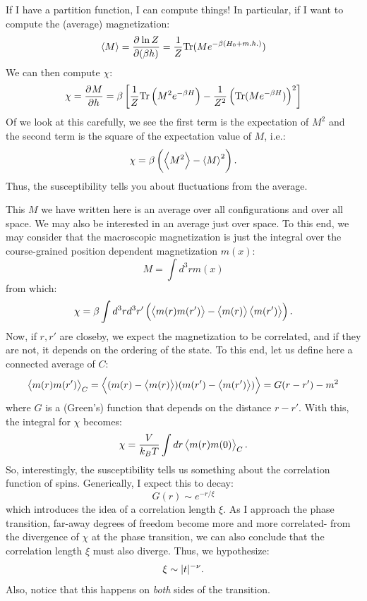 If I have a partition function, I can compute things! In particular, if I want to compute the (average) magnetization:
\begin{equation}
    \avg{M} = \dpd{\ln Z}{(\beta h)} = \frac{1}{Z}\Tr(Me^{-\beta(H_0 + m.h.)})
\end{equation}
We can then compute $\chi$:
\begin{equation}
    \chi = \dpd{M}{h} = \beta\left[\frac{1}{Z}\Tr\left(M^2e^{-\beta H}\right) - \frac{1}{Z^2}\left(\Tr(Me^{-\beta H})\right)^2\right]
\end{equation}
Of we look at this carefully, we see the first term is the expectation of $M^2$ and the second term is the square of the expectation value of $M$, i.e.:
\begin{equation}
    \chi = \beta\left(\left< M^2 \right> - \left< M \right>^2\right).
\end{equation}
Thus, the susceptibility tells you about fluctuations from the average.

This $M$ we have written here is an average over all configurations and over all space. We may also be interested in an average just over space. To this end, we may consider that the macroscopic magnetization is just the integral over the course-grained position dependent magnetization $m(x)$:
\begin{equation}
    M = \int d^3r m(x)
\end{equation}
from which:
\begin{equation}
    \chi = \beta \int d^3r d^3r' \left(\left< m(r)m(r') \right> - \left< m(r) \right>\left< m(r') \right>\right).
\end{equation}
Now, if $r, r'$ are closeby, we expect the magnetization to be correlated, and if they are not, it depends on the ordering of the state. To this end, let us define here a connected average of $C$:
\begin{equation}
    \left< m(r)m(r') \right>_C = \left< (m(r) - \left< m(r) \right>)(m(r') - \left< m(r') \right>) \right> = G(r-r') - m^2
\end{equation}
where $G$ is a (Green's) function that depends on the distance $r-r'$. With this, the integral for $\chi$ becomes:
\begin{equation}
    \chi = \frac{V}{k_B T}\int dr \left< m(r)m(0) \right>_C.
\end{equation}
So, interestingly, the susceptibility tells us something about the correlation function of spins. Generically, I expect this to decay:
\begin{equation}
    G(r) \sim e^{-r/\xi}
\end{equation}
which introduces the idea of a correlation length $\xi$. As I approach the phase transition, far-away degrees of freedom become more and more correlated- from the divergence of $\chi$ at the phase transition, we can also conclude that the correlation length $\xi$ must also diverge. Thus, we hypothesize:
\begin{equation}
    \xi \sim \lvert t \rvert^{-\nu}.
\end{equation}
Also, notice that this happens on \emph{both} sides of the transition.

